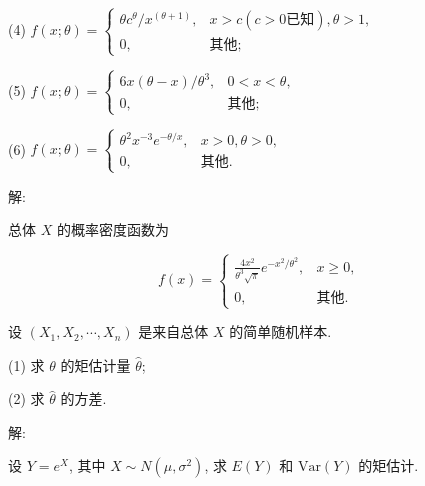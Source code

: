 \documentclass[standard]{ExBook}
\begin{document}
\begin{qitems}
\begin{bbox}
\begin{shaded}
(4) \(f(x; \theta) = 
\begin{cases} 
\theta c^{\theta}/x^{(\theta+1)}, & x > c (c > 0 \text{已知}), \theta > 1, \\
0, & \text{其他};
\end{cases}\)

(5) \(f(x; \theta) = 
\begin{cases} 
6x(\theta - x)/\theta^3, & 0 < x < \theta, \\
0, & \text{其他};
\end{cases}\)

(6) \(f(x; \theta) = 
\begin{cases} 
\theta^2x^{-3}e^{-\theta/x}, & x > 0, \theta > 0, \\
0, & \text{其他}.
\end{cases}\)
    \end{shaded}
    \end{bbox}

\vspace{-5em}

    \begin{bbox}
解: 
    \end{bbox}

\vspace{-5em}

    \begin{bbox}
    \begin{shaded}
        \qitem
总体 \(X\) 的概率密度函数为

\[f(x) = 
\begin{cases} 
\displaystyle\frac{4x^2}{\theta^3\sqrt{\pi}}e^{-x^2/\theta^2}, & x \geq 0, \\
0, & \text{其他}.
\end{cases}\]

设 \((X_1, X_2, \cdots, X_n)\) 是来自总体 \(X\) 的简单随机样本.

(1) 求 \(\theta\) 的矩估计量 \(\hat{\theta}\);

(2) 求 \(\hat{\theta}\) 的方差.
    \end{shaded}
    \end{bbox}

\vspace{-5em}

    \begin{bbox}
解: 
    \end{bbox}

\vspace{-5em}

    \begin{bbox}
    \begin{shaded}
        \qitem
设 \(Y = e^X\), 其中 \(X \sim N(\mu, \sigma^2)\), 求 \(E(Y)\) 和 \(\text{Var}(Y)\) 的矩估计.
    \end{shaded}
    \end{bbox}


\end{qitems}
\end{document}
